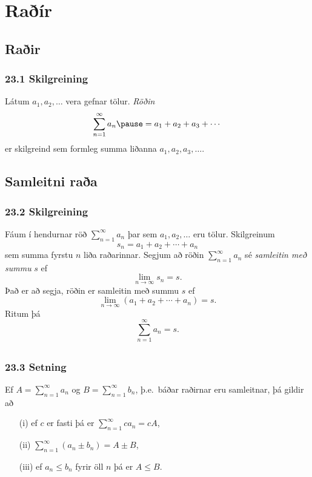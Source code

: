 \section*{Raðír}
\subsection[t]{Raðir}
 \subsubsection{23.1 Skilgreining}
Látum $a_1, a_2, \ldots$ vera gefnar tölur. \pause
{\em Röðin}
$$\sum_{n=1}^\infty a_n \pause = a_1+a_2+a_3+\cdots$$
er skilgreind sem formleg summa liðanna $a_1, a_2, a_3, \ldots$.
 


\subsection[t]{Samleitni raða}
 \subsubsection{23.2 Skilgreining} 
Fáum í hendurnar röð  $\sum_{n=1}^\infty
a_n$ þar sem $a_1, a_2, \ldots$ eru tölur.  \pause
Skilgreinum 
$$s_n=a_1+a_2+\cdots+a_n$$
sem summa fyrstu $n$ liða raðarinnar. \pause 
Segjum að röðin 
$\sum_{n=1}^\infty a_n$ sé \emph{samleitin með summu} $s$ ef 
$$\lim_{n\rightarrow\infty}s_n=s.$$ \pause
Það er að segja, röðin er samleitin með summu $s$ ef
$$\lim_{n\rightarrow \infty}(a_1+a_2+\cdots+a_n)=s.$$ \pause
Ritum þá $$\sum_{n=1}^\infty a_n=s.$$
 


\subsection[t]{}
 \subsubsection{23.3 Setning}
Ef $A=\sum_{n=1}^\infty a_n$ og $B=\sum_{n=1}^\infty b_n$, þ.e.~báðar
raðirnar eru samleitnar, \pause þá gildir að

\begin{itemize} 
\item [(i)]  ef $c$ er fasti þá er $\sum_{n=1}^\infty ca_n=cA$, \pause 
\item [(ii)]  $\sum_{n=1}^\infty (a_n\pm b_n)=A\pm B$, \pause
\item [(iii)]  ef $a_n\leq b_n$ fyrir öll $n$ þá er $A\leq B$.
\end{itemize}
 
